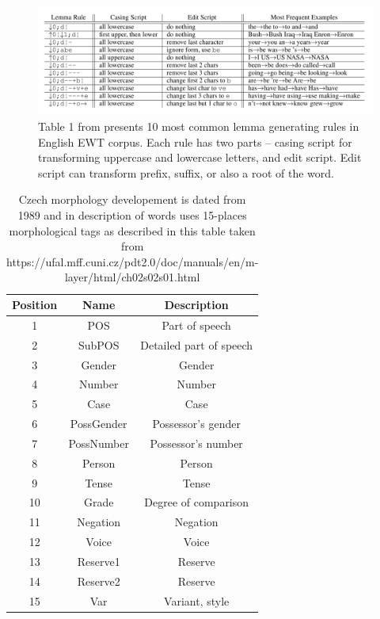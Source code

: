 \begin{figure}[H]
\centering
\includegraphics[width=1\textwidth]{../img/lemma_rules}
\protect\caption{
Table 1 from \citep{Straka2019b} presents 10 most common lemma generating rules in English EWT corpus. Each rule has two parts -- casing script for transforming uppercase and lowercase letters, and edit script. Edit script can transform prefix, suffix, or also a root of the word.
}
\label{fig:lemma_rules}
\end{figure}

\begin{table}
\centering
\label{Tab:tagset}
\begin{tabular}{ |c|c|c| } 

 \hline
 Position & Name & Description \\ 
 \hline \hline
 1 & POS & Part of speech \\ \hline
 2 & SubPOS & Detailed part of speech \\ \hline
  3 & Gender & Gender \\ \hline
4 & Number & Number \\\hline
  5 & Case & Case \\ \hline
 6 & PossGender & Possessor's gender \\\hline
  7 & PossNumber & Possessor's number \\ \hline
8 & Person & Person \\\hline
  9 & Tense & Tense \\ \hline
 10 & Grade & Degree of comparison\\\hline
  11 & Negation & Negation \\ \hline
 12 & Voice & Voice \\\hline
 13 & Reserve1 & Reserve \\ \hline
14 & Reserve2 & Reserve \\\hline
  15 & Var & Variant, style \\ 
 \hline

\end{tabular}
\caption{Czech morphology developement is dated from 1989 \citep{Hajic2004} %
and in description of words uses 15-places morphological tags as described in this table taken from https://ufal.mff.cuni.cz/pdt2.0/doc/manuals/en/m-layer/html/ch02s02s01.html}
\end{table}

